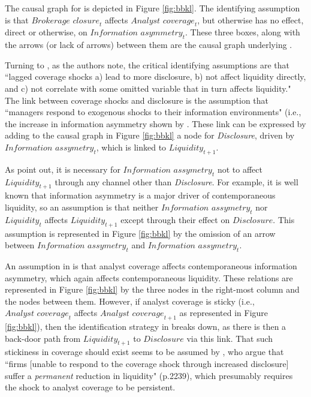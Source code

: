 \documentclass[11pt]{amsart}
\begin{document}
The causal graph for \citet{Kelly:2012ih} is depicted in Figure \ref{fig:bbkl}.
The identifying assumption is that $\textit{Brokerage closure}_t$ affects $\textit{Analyst coverage}_t$, but otherwise has no effect, direct or otherwise, on $\textit{Information asymmetry}_t$.
These three boxes, along with the arrows (or lack of arrows) between them are the causal graph underlying \citet{Kelly:2012ih}.

Turning to \citet{Balakrishnan:2014js}, as the authors note, the critical identifying assumptions are that ``lagged coverage shocks a) lead to more disclosure, b) not affect liquidity directly, and c) not correlate with some omitted variable that in turn affects liquidity." 
The link between coverage shocks and disclosure is the assumption that ``managers respond to exogenous shocks to their information environments" (i.e., the increase in information asymmetry shown by  \citet{Kelly:2012ih}.
These link can be expressed by adding to the causal graph in Figure \ref{fig:bbkl} a node for \textit{Disclosure}, driven by $\textit{Information assymetry}_t$, which is linked to $\textit{Liquidity}_{t+1}$.

As \citet{Balakrishnan:2014js} point out, it is necessary for $\textit{Information assymetry}_t$ not to affect $\textit{Liquidity}_{t+1}$ through any channel other than \textit{Disclosure}.
For example, it is well known that information asymmetry is a major driver of contemporaneous liquidity, so an assumption is that neither $\textit{Information assymetry}_t$ nor $\textit{Liquidity}_t$ affects $\textit{Liquidity}_{t+1}$ except through their effect on $\textit{Disclosure}$. 
This assumption is represented in Figure \ref{fig:bbkl} by the omission of an arrow between $\textit{Information assymetry}_t$ and $\textit{Information assymetry}_t$.

An assumption in \citet{Kelly:2012ih} is that analyst coverage affects contemporaneous information asymmetry, which again affects contemporaneous liquidity.
These relations are represented in Figure \ref{fig:bbkl} by the three nodes in the right-most column and the nodes between them.
However, if analyst coverage is sticky (i.e., $\textit{Analyst coverage}_t$ affects $\textit{Analyst coverage}_{t+1}$ as represented in Figure \ref{fig:bbkl}), then the identification strategy in \citet{Balakrishnan:2014js} breaks down, as there is then a back-door path from $\textit{Liquidity}_{t+1}$ to $\textit{Disclosure}$ via this link.
That such stickiness in coverage should exist seems to be assumed by \citet{Balakrishnan:2014js}, who argue that ``firms [unable to respond  to the coverage shock through increased disclosure] suffer a \emph{permanent} reduction in liquidity" (p.2239), which presumably requires the shock to analyst coverage to be persistent.
\end{document}
